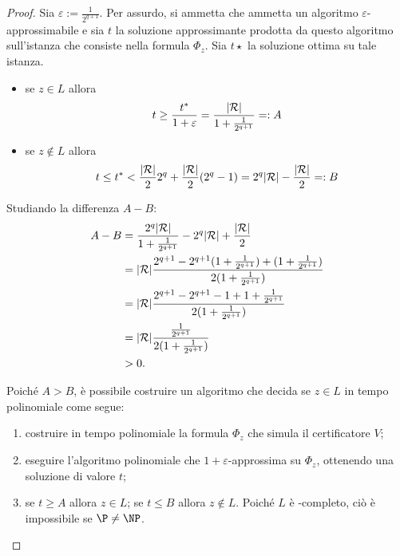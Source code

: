\begin{proof}
	Sia $\varepsilon:=\frac{1}{2^{q+1}}$.
	Per assurdo, si ammetta che \MaxSat ammetta un algoritmo $\varepsilon$-approssimabile e sia $t$ la soluzione approssimante prodotta da questo algoritmo sull'istanza che consiste nella formula $\Phi_z$.
	Sia $t\star$ la soluzione ottima su tale istanza.
	\begin{itemize}
		\item se $z\in L$ allora
		      \begin{equation*}
			      t \geq \frac{t^*}{1+\varepsilon} = \frac{| \mathcal R |}{1+\frac{1}{2^{q+1}}} =: A
		      \end{equation*}
		\item se $z\notin L$ allora
		      \begin{equation*}
			      t \leq t^* < \frac{| \mathcal R |}{2}2^q+\frac{| \mathcal R |}{2}(2^q-1) = 2^q| \mathcal R |-\frac{| \mathcal R |}{2} =: B
		      \end{equation*}
	\end{itemize}
	Studiando la differenza $A-B$:
	\begin{align*}
		A-B & = \frac{2^q| \mathcal R |}{1+\frac{1}{2^{q+1}}} - 2^q| \mathcal R |+\frac{| \mathcal R |}{2}                           \\
		    & = | \mathcal R | \frac{2^{q+1} - 2^{q+1}(1+\frac{1}{2^{q+1}}) + (1+\frac{1}{2^{q+1}})}{2(1+\frac{1}{2^{q+1}})} \\
		    & = | \mathcal R | \frac{2^{q+1} - 2^{q+1}-1 + 1+\frac{1}{2^{q+1}}}{2(1+\frac{1}{2^{q+1}})}                      \\
		    & = | \mathcal R | \frac{\frac{1}{2^{q+1}}}{2(1 + \frac{1}{2^{q+1}})}                                            \\
		    & > 0 \text.
	\end{align*}

	Poiché $A>B$, è possibile costruire un algoritmo che decida se $z\in L$ in tempo polinomiale come segue:
	\begin{enumerate}
		\item costruire in tempo polinomiale la formula $\Phi_z$ che simula il certificatore $V$;
		\item eseguire l'algoritmo polinomiale che $1+\varepsilon$-approssima \MaxSat su $\Phi_z$, ottenendo una soluzione di valore $t$;
		\item se $t\geq A$ allora $z\in L$; se $t\leq B$ allora $z\notin L$.
		      Poiché $L$ è \NP-completo, ciò è impossibile se $\P\neq\NP$.
	\end{enumerate}
\end{proof}


